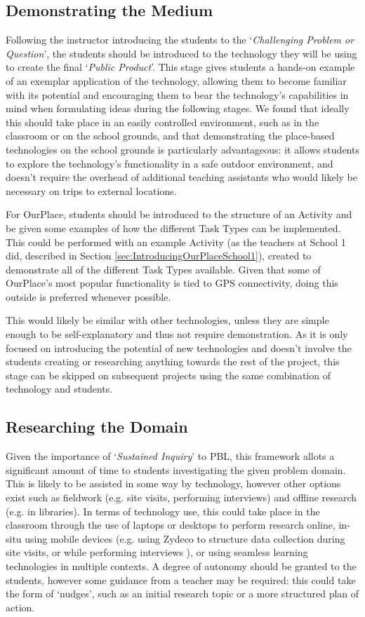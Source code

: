 \subsection{Demonstrating the Medium}

Following the instructor introducing the students to the `\textit{Challenging Problem or Question}', the students should be introduced to the technology they will be using to create the final `\textit{Public Product}'. This stage gives students a hands-on example of an exemplar application of the technology, allowing them to become familiar with its potential and encouraging them to bear the technology's capabilities in mind when formulating ideas during the following stages. We found that ideally this should take place in an easily controlled environment, such as in the classroom or on the school grounds, and that demonstrating the place-based technologies on the school grounds is particularly advantageous: it allows students to explore the technology's functionality in a safe outdoor environment, and doesn't require the overhead of additional teaching assistants who would likely be necessary on trips to external locations. 

For OurPlace, students should be introduced to the structure of an Activity and be given some examples of how the different Task Types can be implemented. This could be performed with an example Activity (as the teachers at School 1 did, described in Section \ref{sec:IntroducingOurPlaceSchool1}), created to demonstrate all of the different Task Types available. Given that some of OurPlace's most popular functionality is tied to GPS connectivity, doing this outside is preferred whenever possible. 

This would likely be similar with other technologies, unless they are simple enough to be self-explanatory and thus not require demonstration. As it is only focused on introducing the potential of new technologies and doesn't involve the students creating or researching anything towards the rest of the project, this stage can be skipped on subsequent projects using the same combination of technology and students.

\subsection{Researching the Domain}
Given the importance of `\textit{Sustained Inquiry}' to PBL, this framework allots a significant amount of time to students investigating the given problem domain. This is likely to be assisted in some way by technology, however other options exist such as fieldwork (e.g. site visits, performing interviews) and offline research (e.g. in libraries). In terms of technology use, this could take place in the classroom through the use of laptops or desktops to perform research online, in-situ using mobile devices (e.g. using Zydeco to structure data collection during site visits, or while performing interviews \citep{kuhn2011}), or using seamless learning technologies in multiple contexts. A degree of autonomy should be granted to the students, however some guidance from a teacher may be required: this could take the form of `nudges', such as an initial research topic or a more structured plan of action.

